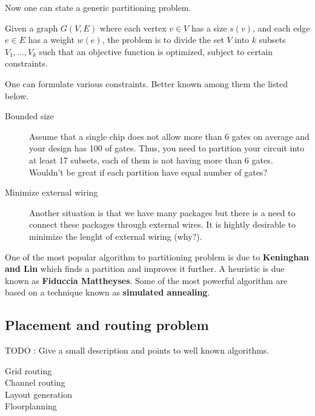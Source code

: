   Now one can state a generic partitioning problem.

  \begin{problem}[40]

    Given a graph $G(V,E)$ where each vertex $v \in V$ has a size $s(v)$, and
    each edge $e \in E$ has a weight $w(e)$, the problem is to divide the set
    $V$ into $k$ subsets $V_1,\ldots,V_k$ such that an objective function is
    optimized, subject to certain constraints.

  \end{problem}

  One can formulate various constraints. Better known among them the listed
  below.

  \begin{description}
  \item [Bounded size] Assume that a single chip does not allow more than 6
  gates on average and your design has 100 of gates. Thus, you need to partition
  your circuit into at least 17 subsets, each of them is not having more than 6
  gates. Wouldn't be great if each partition have equal number of gates?

  \item[Minimize external wiring] Another situation is that we have many
  packages but there is a need to connect these packages through external wires.
  It is hightly desirable to minimize the lenght of external wiring (why?). 

  \end{description}

  One of the most popular algorithm to partitioning problem is due to
  \textbf{Keninghan and Lin} which finds a partition and improves it further.
  A heuristic is due known as \textbf{Fiduccia Mattheyses}. Some of the most
  powerful algorithm are based on a technique known as \textbf{simulated
  annealing}.
  
\subsection{Placement and routing problem}

  TODO : Give a small description and points to well known algorithms.

  \begin{description}
  \item [Grid routing]
  \item [Channel routing]
  \item [Layout generation]
  \item [Floorplanning]
  \end{description}

